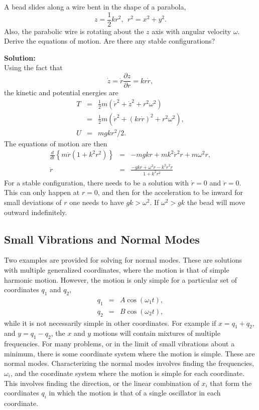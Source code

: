 \example A bead slides along a wire bent in the shape of a parabola,
\[
z=\frac{1}{2}kr^2,~~r^2=x^2+y^2.
\]
Also, the parabolic wire is rotating about the $z$ axis with angular
velocity $\omega$. Derive the equations of motion. Are there any
stable configurations?

{\bf Solution:}\\ Using the fact that
\[
\dot{z}=\dot{r}\frac{\partial z}{\partial r}=kr\dot{r},
\]
the kinetic and potential energies are
\begin{eqnarray*}
T&=&\frac{1}{2}m\left(\dot{r}^2+\dot{z}^2+r^2\omega^2\right)\\ &=&\frac{1}{2}m\left(\dot{r}^2+(kr\dot{r})^2+r^2\omega^2\right),\\ U&=&mgkr^2/2.
\end{eqnarray*}
The equations of motion are then
\begin{eqnarray*}
\frac{d}{dt}\left\{m\dot{r}(1+k^2r^2)\right\}&=&-mgkr+mk^2\dot{r}^2r+m\omega^2r,\\ \ddot{r}&=&\frac{-gkr+\omega^2r-k^2\dot{r}^2r}{1+k^2r^2}
\end{eqnarray*}
For a stable configuration, there needs to be a solution with
$\dot{r}=0$ and $\ddot{r}=0$. This can only happen at $r=0$, and then
for the acceleration to be inward for small deviations of $r$ one
needs to have $gk>\omega^2$. If $\omega^2>gk$ the bead will move
outward indefinitely.

\subsection{Small Vibrations and Normal Modes}

Two examples are provided for solving for normal modes. These are
solutions with multiple generalized coordinates, where the motion is
that of simple harmonic motion. However, the motion is only simple for
a particular set of coordinates $q_1$ and $q_2$,
\begin{eqnarray}
q_1&=&A\cos(\omega_1 t),\\ \nonumber q_2&=&B\cos(\omega_2 t),
\end{eqnarray}
while it is not necessarily simple in other coordinates. For example
if $x=q_1+q_2$, and $y=q_1-q_2$, the $x$ and $y$ motions will contain
mixtures of multiple frequencies. For many problems, or in the limit
of small vibrations about a minimum, there is some coordinate system
where the motion is simple. These are normal modes. Characterizing the
normal modes involves finding the frequencies, $\omega_i$, and the
coordinate system where the motion is simple for each coordinate. This
involves finding the direction, or the linear combination of $x_i$
that form the coordinates $q_i$ in which the motion is that of a
single oscillator in each coordinate.

